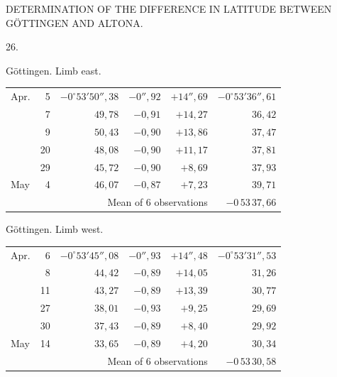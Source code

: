 \clearpage
\noindent{}\parbox[t]{\dimexpr\textwidth-10mm\relax}{\centering\scriptsize DETERMINATION OF THE DIFFERENCE IN LATITUDE BETWEEN GÖTTINGEN AND ALTONA.}\par
\begin{center}26.\end{center}

\noindent\begin{minipage}[t]{.495\textwidth}\centering Göttingen. Limb east.\par\smallskip
{\scriptsize\setlength{\tabcolsep}{1pt}\renewcommand{\arraystretch}{1.2}\begin{tabular}{lr|r|r|r|r|}
Apr.&5&$-0^\circ53'50''{,}38$&$-0''{,}92$&$+14''{,}69$&$-0^\circ53'36''{,}61$\\
&7&$49{,}78$&$-0{,}91$&$+14{,}27$&$36{,}42$\\
&9&$50{,}43$&$-0{,}90$&$+13{,}86$&$37{,}47$\\
&20&$48{,}08$&$-0{,}90$&$+11{,}17$&$37{,}81$\\
&29&$45{,}72$&$-0{,}90$&$+8{,}69$&$37{,}93$\\
May&4&$46{,}07$&$-0{,}87$&$+7{,}23$&$39{,}71$\\
\cline{6-6}\multicolumn{5}{r}{Mean of 6 observations}&$-0\,53\,37{,}66$
\end{tabular}}\end{minipage}\hfill\begin{minipage}[t]{.495\textwidth}\centering Göttingen. Limb west.\par\smallskip
{\scriptsize\setlength{\tabcolsep}{1pt}\renewcommand{\arraystretch}{1.2}\begin{tabular}{lr|r|r|r|r}
Apr.&6&$-0^\circ53'45''{,}08$&$-0''{,}93$&$+14''{,}48$&$-0^\circ53'31''{,}53$\\
&8&$44{,}42$&$-0{,}89$&$+14{,}05$&$31{,}26$\\
&11&$43{,}27$&$-0{,}89$&$+13{,}39$&$30{,}77$\\
&27&$38{,}01$&$-0{,}93$&$+9{,}25$&$29{,}69$\\
&30&$37{,}43$&$-0{,}89$&$+8{,}40$&$29{,}92$\\
May&14&$33{,}65$&$-0{,}89$&$+4{,}20$&$30{,}34$\\
\cline{6-6}\multicolumn{5}{r}{Mean of 6 observations}&$-0\,53\,30{,}58$
\end{tabular}}\end{minipage}
\par\vspace{4mm}

